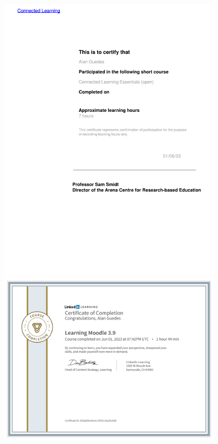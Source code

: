 \documentclass[10pt,a4paper,sans,colorlinks]{moderncv}
\begin{document}
\begin{figure}
    \includegraphics[align=t,width=\textwidth,height=0.4\textheight, keepaspectratio=true]{certificates/ConnectedLearningEssentials.pdf}
    \includegraphics[align=t,width=\textwidth,height=0.22\textheight, keepaspectratio=true]{certificates/Moodle39.pdf}
\end{figure}
\end{document}
